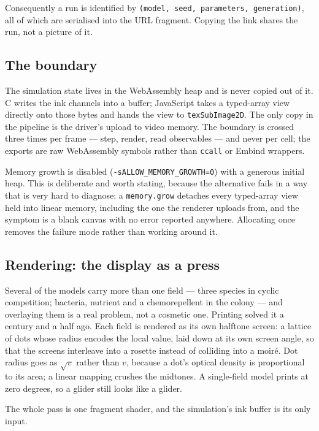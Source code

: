 \documentclass[11pt,a4paper]{article}
\begin{document}
Consequently a run is identified by \texttt{(model, seed, parameters,
generation)}, all of which are serialised into the URL fragment. Copying the link
shares the run, not a picture of it.

\subsection{The boundary}

The simulation state lives in the WebAssembly heap and is never copied out of it.
C writes the ink channels into a buffer; JavaScript takes a typed-array view
directly onto those bytes and hands the view to \texttt{texSubImage2D}. The only
copy in the pipeline is the driver's upload to video memory. The boundary is
crossed three times per frame --- step, render, read observables --- and never
per cell; the exports are raw WebAssembly symbols rather than \texttt{ccall} or
Embind wrappers.

Memory growth is disabled (\texttt{-sALLOW\_MEMORY\_GROWTH=0}) with a
generous initial heap. This is deliberate and worth stating, because the
alternative fails in a way that is very hard to diagnose: a \texttt{memory.grow}
detaches every typed-array view held into linear memory, including the one the
renderer uploads from, and the symptom is a blank canvas with no error reported
anywhere. Allocating once removes the failure mode rather than working around it.

\subsection{Rendering: the display as a press}
\label{sec:render}

Several of the models carry more than one field --- three species in cyclic
competition; bacteria, nutrient and a chemorepellent in the colony --- and
overlaying them is a real problem, not a cosmetic one. Printing solved it a
century and a half ago. Each field is rendered as its own halftone screen: a
lattice of dots whose radius encodes the local value, laid down at its own screen
angle, so that the screens interleave into a rosette instead of colliding into a
moir\'{e}. Dot radius goes as $\sqrt{v}$ rather than $v$, because a dot's optical
density is proportional to its area; a linear mapping crushes the midtones. A
single-field model prints at zero degrees, so a glider still looks like a glider.

The whole pass is one fragment shader, and the simulation's ink buffer is its
only input.
\end{document}
